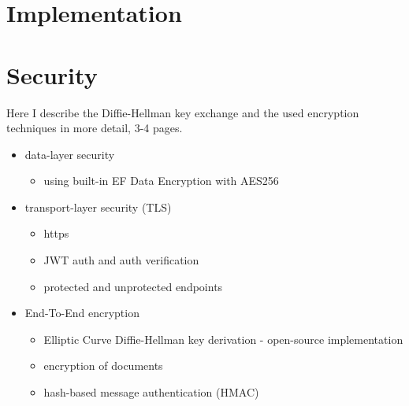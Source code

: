 \section{Implementation}


\section{Security}
Here I describe the Diffie-Hellman key exchange and the used encryption techniques in more detail, 3-4 pages.

\begin{itemize}
	\item data-layer security
	\begin{itemize}
		\item using built-in EF Data Encryption with AES256
	\end{itemize}
	\item transport-layer security (TLS)
	\begin{itemize}
		\item https
		\item JWT auth and auth verification
		\item protected and unprotected endpoints
	\end{itemize}
	\item End-To-End encryption
	\begin{itemize}
		\item Elliptic Curve Diffie-Hellman key derivation - open-source implementation
		\item encryption of documents
		\item hash-based message authentication (HMAC)
	\end{itemize}
\end{itemize}